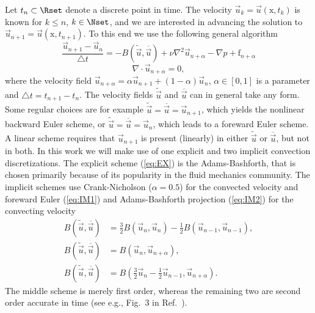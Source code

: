 Let $t_n \subset \Rset$ denote a discrete point in time. The velocity $\vec{u}_k=\vec{u}(\text{x},t_k)$ is known for $k\le n$, $k \in \Nset$, and we are interested in advancing the solution to $\vec{u}_{n+1}=\vec{u}(\text{x},t_{n+1})$. To this end we use the following general algorithm
\begin{equation}
\label{eq:NS_d} \frac{\vec{u}_{n+1}-\vec{u}_{n}}{\triangle t} = - B(\tilde{\vec{u}},\overline{\vec{u}}) + \nu \nabla^2 \vec{u}_{n+\alpha} -\nabla p + \text{f}_{n+\alpha}
\end{equation}
\begin{equation}
 \label{eq:cont_d} \nabla \cdot \vec{u}_{n+\alpha} =0,
\end{equation}
where the velocity field $\vec{u}_{n+\alpha}=\alpha \vec{u}_{n+1} + (1-\alpha) \vec{u}_{n}$, $\alpha \in [0,1]$ is a parameter and $\triangle t = t_{n+1}-t_n$. The velocity fields $\tilde{\vec{u}}$ and $\overline{\vec{u}}$ can in general take any form. Some regular choices are for example $\tilde{\vec{u}}=\overline{\vec{u}}=\vec{u}_{n+1}$, which yields the nonlinear backward Euler scheme, or $\tilde{\vec{u}} = \overline{\vec{u}} = \vec{u}_{n}$, which leads to a foreward Euler scheme. A linear scheme requires that $\vec{u}_{n+1}$ is present (linearly) in either $\tilde{\vec{u}}$ or $\overline{\vec{u}}$, but not in both. In this work we will make use of one explicit and two implicit convection discretizations. The explicit scheme (\ref{eq:EX}) is the Adams-Bashforth, that is chosen primarily because of its popularity in the fluid mechanics community. The implicit schemes use Crank-Nicholson ($\alpha=0.5$) for the convected velocity and foreward Euler (\ref{eq:IM1}) and Adams-Bashforth projection (\ref{eq:IM2}) for the convecting velocity
\begin{align}
\label{eq:EX} B(\tilde{\vec{u}},\overline{\vec{u}}) &=\frac{3}{2}B(\vec{u}_n,\vec{u}_n)-\frac{1}{2}B(\vec{u}_{n-1},\vec{u}_{n-1}), \\
\label{eq:IM1} B(\tilde{\vec{u}},\overline{\vec{u}}) &=B(\vec{u}_{n},\vec{u}_{n+\alpha}), \\
 \label{eq:IM2} B(\tilde{\vec{u}},\overline{\vec{u}}) &=B(\frac{3}{2}\vec{u}_{n}-\frac{1}{2}\vec{u}_{n-1},\vec{u}_{n+\alpha}).
\end{align}
The middle scheme is merely first order, whereas the remaining two are second order accurate in time (see e.g., Fig.~3 in Ref.~\cite{simo94}).

